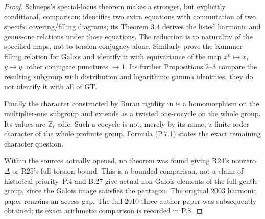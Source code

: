 \begin{proof}
Schneps's special-locus theorem makes a stronger,
but explicitly conditional, comparison:
\cite[Theorem 3.1]{ROOT_SchnepsSpecial2006} identifies
two extra equations with commutation of two specific
covering/filling diagrams; its Theorem 3.4 derives
the listed harmonic and genus-one relations under
those equations. The reduction is to naturality
of the specified maps, not to torsion conjugacy alone.
Similarly \cite[Theorem 1 and Proposition 1]{ROOT_Ihara2000}
prove the Kummer filling relation for Galois and
identify it with equivariance of the map
$x^n\mapsto x$, $y\mapsto y$, other conjugate
punctures $\mapsto1$. Its further Propositions 2--3
compare the resulting subgroup with distribution
and logarithmic gamma identities; they do not
identify it with all of GT.

Finally the character constructed by Burau rigidity
in \cite[\S4]{ROOT_Marin2008} is a homomorphism on
the multiplier-one subgroup and extends as a twisted
one-cocycle on the whole group. Its values are
$\mathbb Z_\ell$-adic. Such a cocycle is not,
merely by its name, a finite-order character of
the whole profinite group. Formula (P.7.1) states
the exact remaining character question.

Within the sources actually opened, no theorem was
found giving R24's nonzero $\Delta$ or R25's full
torsion bound. This is a bounded comparison, not
a claim of historical priority. P.4 and B.27 give
actual non-Galois elements of the full gentle
group, since the Galois image satisfies the pentagon.
The original 2003 harmonic paper remains an access gap.
The full 2010 three-author paper was subsequently obtained;
its exact arithmetic comparison is recorded in P.8.
\end{proof}

